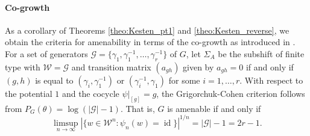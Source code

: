 \documentclass[10pt]{article}
\theoremstyle{mystyle}
\newcommand{\cW}{\mathcal{W}}
\newcommand{\te}{{\theta}}
\newcommand{\Sig}{{\Sigma}}
\newcommand{\1}{\mathbf{1}}
\newcommand{\with}{:}
\DeclareMathOperator{\id}{id}
\begin{document}
%
\paragraph{Co-growth} As a corollary of Theorems \ref{theo:Kesten_pt1} and \ref{theo:Kesten_reverse}, we obtain the criteria for amenability in terms of the co-growth as introduced in \cite{Grigorchuk:1980}. For a set of generators $\mathcal{G}=\{\gamma_1, \gamma_1^{-1}, \ldots, \gamma_r^{-1}\}$ of $G$, let $\Sig_A$ be the subshift of finite type with $\cW=\mathcal{G}$ and transition matrix $(a_{gh})$ given by $a_{gh}=0$ if and only if $(g,h)$ is equal to $(\gamma_i,\gamma_1^{-1})$ or $(\gamma_i^{-1},\gamma_1)$ for some $i=1,\ldots,r$. With respect to the potential $1$ and the cocycle $\psi|_{[g]}=g$, the Grigorchuk-Cohen criterion follows from $P_G(\te)=\log(|\mathcal{G}|-1)$. That is, $G$ is amenable if and only if   
 \[ \limsup_{n \to \infty} |\{w \in \cW^n \with \psi_n(w)=\id \}|^{1/n} =  |\mathcal{G}|-1=2r-1.\]
\end{document}
